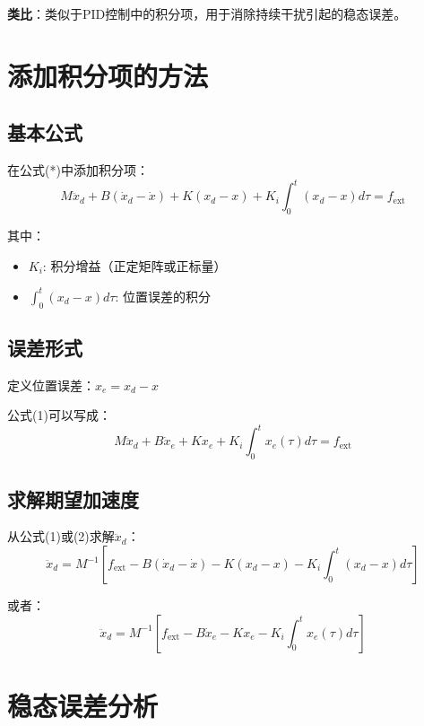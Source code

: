 \documentclass[12pt,a4paper]{article}
\begin{document}
\textbf{类比}：类似于PID控制中的积分项，用于消除持续干扰引起的稳态误差。

\section{添加积分项的方法}

\subsection{基本公式}

在公式(*)中添加积分项：
\begin{equation}
M\ddot{x}_d + B(\dot{x}_d - \dot{x}) + K(x_d - x) + K_i \int_0^t (x_d - x) d\tau = f_{\text{ext}} \tag{1}
\end{equation}

其中：
\begin{itemize}
\item $K_i$: 积分增益（正定矩阵或正标量）
\item $\int_0^t (x_d - x) d\tau$: 位置误差的积分
\end{itemize}

\subsection{误差形式}

定义位置误差：$x_e = x_d - x$

公式(1)可以写成：
\begin{equation}
M\ddot{x}_d + B\dot{x}_e + Kx_e + K_i \int_0^t x_e(\tau) d\tau = f_{\text{ext}} \tag{2}
\end{equation}

\subsection{求解期望加速度}

从公式(1)或(2)求解$\ddot{x}_d$：
\begin{equation}
\ddot{x}_d = M^{-1}\left[f_{\text{ext}} - B(\dot{x}_d - \dot{x}) - K(x_d - x) - K_i \int_0^t (x_d - x) d\tau\right] \tag{3}
\end{equation}

或者：
\begin{equation}
\ddot{x}_d = M^{-1}\left[f_{\text{ext}} - B\dot{x}_e - Kx_e - K_i \int_0^t x_e(\tau) d\tau\right] \tag{4}
\end{equation}

\section{稳态误差分析}
\end{document}

